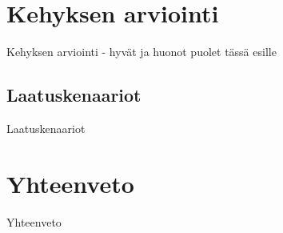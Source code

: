 \documentclass[finnish]{tktltiki2}
\theoremstyle{definition}
\theoremstyle{remark}
\numberwithin{figure}{section}
\begin{document}
\section{Kehyksen arviointi}

Kehyksen arviointi - hyvät ja huonot puolet tässä esille

\subsection{Laatuskenaariot}

Laatuskenaariot


\section{Yhteenveto}

Yhteenveto





%
%
% 
%


%

\renewcommand{\BRetrieved}[1]{Tarkistettu {#1}, saatavilla\ }
\renewcommand{\BRetrievedFrom}{Tarkistettu saatavilla\ }




% 
\end{document}
